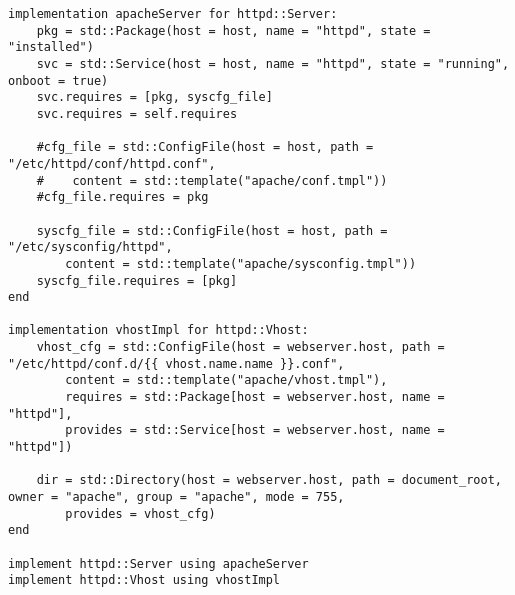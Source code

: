 \begin{minipage}
\begin{lstlisting}[label=listing:apache_model]
implementation apacheServer for httpd::Server:
    pkg = std::Package(host = host, name = "httpd", state = "installed")
    svc = std::Service(host = host, name = "httpd", state = "running", onboot = true)
    svc.requires = [pkg, syscfg_file]
    svc.requires = self.requires
    
    #cfg_file = std::ConfigFile(host = host, path = "/etc/httpd/conf/httpd.conf",
    #    content = std::template("apache/conf.tmpl"))
    #cfg_file.requires = pkg

    syscfg_file = std::ConfigFile(host = host, path = "/etc/sysconfig/httpd",
        content = std::template("apache/sysconfig.tmpl"))
    syscfg_file.requires = [pkg]
end

implementation vhostImpl for httpd::Vhost:
    vhost_cfg = std::ConfigFile(host = webserver.host, path = "/etc/httpd/conf.d/{{ vhost.name.name }}.conf",
        content = std::template("apache/vhost.tmpl"), 
        requires = std::Package[host = webserver.host, name = "httpd"],
        provides = std::Service[host = webserver.host, name = "httpd"])

    dir = std::Directory(host = webserver.host, path = document_root, owner = "apache", group = "apache", mode = 755,
        provides = vhost_cfg)
end

implement httpd::Server using apacheServer
implement httpd::Vhost using vhostImpl
\end{lstlisting}
\end{minipage}
